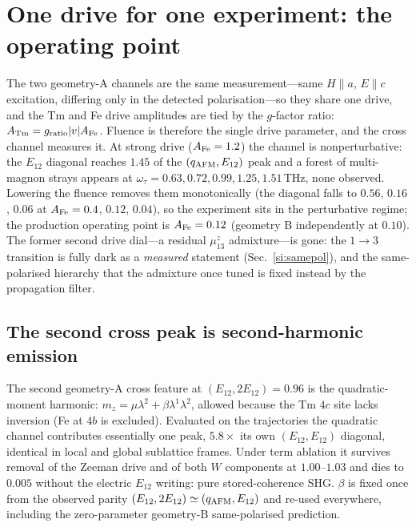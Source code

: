\documentclass[11pt]{article}
\newcommand{\qafm}{q_{\rm AFM}}
\begin{document}
\section{One drive for one experiment: the operating point}
\label{si:operating}

The two geometry-A channels are the same measurement---same
$H\!\parallel\!a$, $E\!\parallel\!c$ excitation, differing only in the
detected polarisation---so they share one drive, and the Tm and Fe
drive amplitudes are tied by the $g$-factor ratio:
$A_{\rm Tm}=g_{\rm ratio}|v|A_{\rm Fe}$.  Fluence is therefore the
single drive parameter, and the cross channel measures it.  At strong
drive ($A_{\rm Fe}=1.2$) the channel is nonperturbative: the $E_{12}$
diagonal reaches $1.45$ of the $(\qafm,E_{12})$ peak and a forest of
multi-magnon strays appears at
$\omega_\tau=0.63,0.72,0.99,1.25,1.51$\,THz, none observed.  Lowering
the fluence removes them monotonically (the diagonal falls to $0.56$,
$0.16$, $0.06$ at $A_{\rm Fe}=0.4$, $0.12$, $0.04$), so the experiment
sits in the perturbative regime; the production operating point is
$A_{\rm Fe}=0.12$ (geometry B independently at $0.10$).  The former
second drive dial---a residual $\mu^z_{13}$ admixture---is gone: the
$1\!\to\!3$ transition is fully dark as a \emph{measured} statement
(Sec.~\ref{si:samepol}), and the same-polarised hierarchy that the
admixture once tuned is fixed instead by the propagation filter.

\subsection*{The second cross peak is second-harmonic emission}
The second geometry-A cross feature at $(E_{12},2E_{12})=0.96$ is the
quadratic-moment harmonic: $m_z=\mu\lambda^2+\beta\lambda^1\lambda^2$,
allowed because the Tm $4c$ site lacks inversion (Fe at $4b$ is
excluded).  Evaluated on the trajectories the quadratic channel
contributes essentially one peak, $5.8\times$ its own
$(E_{12},E_{12})$ diagonal, identical in local and global sublattice
frames.  Under term ablation it survives removal of the Zeeman drive
and of both $W$ components at $1.00$--$1.03$ and dies to $0.005$
without the electric $E_{12}$ writing: pure stored-coherence SHG.
$\beta$ is fixed once from the observed parity
$(E_{12},2E_{12})\simeq(\qafm,E_{12})$ and re-used everywhere,
including the zero-parameter geometry-B same-polarised prediction.
\end{document}
